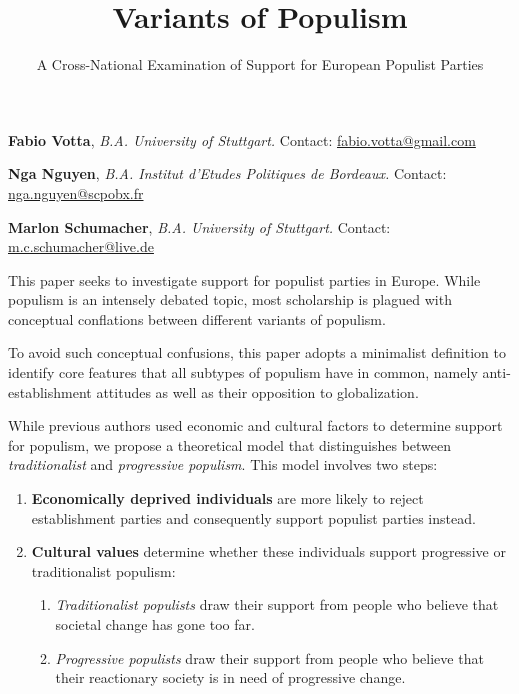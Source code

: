 \documentclass[]{article}
\title{Variants of Populism}
\subtitle{A Cross-National Examination of Support for European Populist Parties}
\author{}
\date{}
\begin{document}
\maketitle

\begin{center}

\textbf{Fabio Votta}, \textit{B.A. University of Stuttgart.} Contact: \href{fabio.votta@gmail.com}{fabio.votta@gmail.com}

\textbf{Nga Nguyen}, \textit{B.A. Institut d'Etudes Politiques de Bordeaux.} Contact: \href{nga.nguyen@scpobx.fr}{nga.nguyen@scpobx.fr}

\textbf{Marlon Schumacher}, \textit{B.A. University of Stuttgart.} Contact: \href{m.c.schumacher@live.de}{m.c.schumacher@live.de}

\end{center}

\vspace{0.5cm}


This paper seeks to investigate support for populist parties in Europe.
While populism is an intensely debated topic, most scholarship is
plagued with conceptual conflations between different variants of
populism.

To avoid such conceptual confusions, this paper adopts a minimalist
definition to identify core features that all subtypes of populism have
in common, namely anti-establishment attitudes as well as their
opposition to globalization.

While previous authors used economic and cultural factors to determine
support for populism, we propose a theoretical model that distinguishes
between \emph{traditionalist} and \emph{progressive populism}. This
model involves two steps:

\begin{enumerate}
\renewcommand{\labelenumii}{\alph{enumii}.}
\item \textbf{Economically deprived individuals} are more likely to reject establishment parties and consequently support populist parties instead. 
\item \textbf{Cultural values} determine whether these individuals support progressive or traditionalist populism: 
\begin{enumerate}
\item \textit{Traditionalist populists} draw their support from people who believe  that societal change has gone too far.
\item \textit{Progressive populists} draw their support from people who believe that their reactionary society is in need of progressive change.
\end{enumerate}
\end{enumerate}
\end{document}
